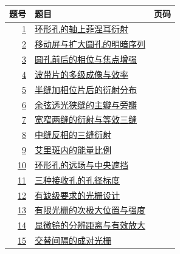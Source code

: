 \documentclass[UTF8,fontset=fandol,a4paper,11pt]{ctexart}
\begin{document}
\begin{longtable}{@{}r p{113mm} r@{}}\toprule 题号 & 题目 & 页码\\\midrule

\hyperref[q:1]{1} & \hyperref[q:1]{环形孔的轴上菲涅耳衍射} & \pageref{q:1} \\

\hyperref[q:2]{2} & \hyperref[q:2]{移动屏与扩大圆孔的明暗序列} & \pageref{q:2} \\

\hyperref[q:3]{3} & \hyperref[q:3]{圆孔前后的相位与焦点增强} & \pageref{q:3} \\

\hyperref[q:4]{4} & \hyperref[q:4]{波带片的多级成像与效率} & \pageref{q:4} \\

\hyperref[q:5]{5} & \hyperref[q:5]{半缝加相位片后的衍射分布} & \pageref{q:5} \\

\hyperref[q:6]{6} & \hyperref[q:6]{余弦透光狭缝的主瓣与旁瓣} & \pageref{q:6} \\

\hyperref[q:7]{7} & \hyperref[q:7]{宽窄两缝的衍射与等效三缝} & \pageref{q:7} \\

\hyperref[q:8]{8} & \hyperref[q:8]{中缝反相的三缝衍射} & \pageref{q:8} \\

\hyperref[q:9]{9} & \hyperref[q:9]{艾里斑内的能量比例} & \pageref{q:9} \\

\hyperref[q:10]{10} & \hyperref[q:10]{环形孔的远场与中央遮挡} & \pageref{q:10} \\

\hyperref[q:11]{11} & \hyperref[q:11]{三种接收孔的孔径标度} & \pageref{q:11} \\

\hyperref[q:12]{12} & \hyperref[q:12]{有缺级要求的光栅设计} & \pageref{q:12} \\

\hyperref[q:13]{13} & \hyperref[q:13]{有限光栅的次极大位置与强度} & \pageref{q:13} \\

\hyperref[q:14]{14} & \hyperref[q:14]{显微镜的分辨距离与有效放大} & \pageref{q:14} \\

\hyperref[q:15]{15} & \hyperref[q:15]{交替间隔的成对光栅} & \pageref{q:15} \\


\end{longtable}
\end{document}
